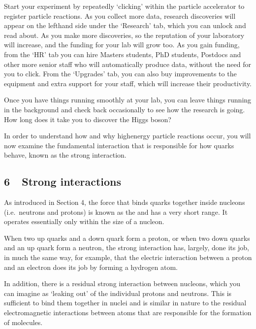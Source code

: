 \documentclass[letterpaper,10pt,english]{sphinxmanual}
\begin{document}

Start your experiment by repeatedly ‘clicking’ within the particle accelerator to register particle reactions. As you collect more data, research discoveries will appear on the left\sphinxhyphen{}hand side under the ‘Research’ tab, which you can unlock and read about. As you make more discoveries, so the reputation of your laboratory will increase, and the funding for your lab will grow too. As you gain funding, from the ‘HR’ tab you can hire Masters students, PhD students, Postdocs and other more senior
staff who will automatically produce data, without the need for you to click. From the ‘Upgrades’ tab, you can also buy improvements to the equipment and extra support for your staff, which will increase their productivity.

Once you have things running smoothly at your lab, you can leave things running in the background and check back occasionally to see how the research is going. How long does it take you to discover the Higgs boson?

In order to understand how and why high\sphinxhyphen{}energy particle reactions occur, you will now examine the fundamental interaction that is responsible for how quarks behave, known as the strong interaction.


\subsection{6  Strong interactions}
\label{\detokenize{content/session_00/Part_00_06:6_xa0_xa0Strong-interactions}}\label{\detokenize{content/session_00/Part_00_06::doc}}
As introduced in Section 4, the force that binds quarks together inside nucleons (i.e. neutrons and protons) is known as the  and has a very short range. It operates essentially only within the size of a nucleon.

When two up quarks and a down quark form a proton, or when two down quarks and an up quark form a neutron, the strong interaction has, largely, done its job, in much the same way, for example, that the electric interaction between a proton and an electron does its job by forming a hydrogen atom.

In addition, there is a residual strong interaction between nucleons, which you can imagine as ‘leaking out’ of the individual protons and neutrons. This is sufficient to bind them together in nuclei and is similar in nature to the residual electromagnetic interactions between atoms that are responsible for the formation of molecules.
\end{document}
